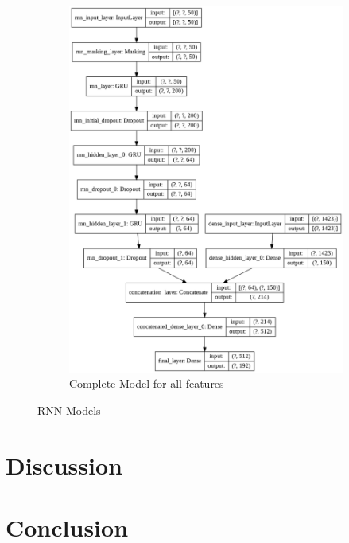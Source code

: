 \documentclass[acmsmall]{acmart}
\begin{document}
\begin{figure}[H]
\begin{subfigure}{.5\textwidth}
  \includegraphics[width=.9\linewidth]{assets/AuthorAttributionModel_all_features.png}
  \caption{Complete Model for all features}
    \label{fig:complete_model}
 \end{subfigure}
 \caption{RNN Models}
\label{fig:rnn_models}
\end{figure}


\section{Discussion}

\section{Conclusion}


\pagebreak



\end{document}
